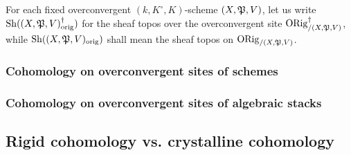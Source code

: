             \begin{convention}
                For each fixed overconvergent $(k, K^{\circ}, K)$-scheme $(X, \mathfrak{P}, V)$, let us write $\mathrm{Sh}((X, \mathfrak{P}, V)_{\mathrm{orig}}^{\dagger})$ for the sheaf topos over the overconvergent site $\mathrm{ORig}^{\dagger}_{/(X, \mathfrak{P}, V)}$, while $\mathrm{Sh}((X, \mathfrak{P}, V)_{\mathrm{orig}})$ shall mean the sheaf topos on $\mathrm{ORig}_{/(X, \mathfrak{P}, V)}$.
            \end{convention}
        
        \subsubsection{Cohomology on overconvergent sites of schemes}
        
        \subsubsection{Cohomology on overconvergent sites of algebraic stacks}
        
    \subsection{Rigid cohomology vs. crystalline cohomology}